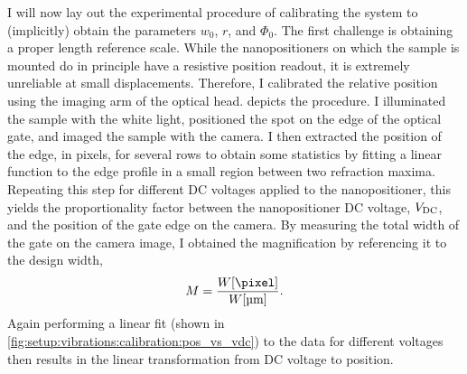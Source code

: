 I will now lay out the experimental procedure of calibrating the system to (implicitly) obtain the parameters $w_0$, $r$, and $\Phi_0$.
The first challenge is obtaining a proper length reference scale.
While the nanopositioners on which the sample is mounted do in principle have a resistive position readout, it is extremely unreliable at small displacements.
Therefore, I calibrated the relative position using the imaging arm of the optical head.
 depicts the procedure.
I illuminated the sample with the white light, positioned the spot on the edge of the optical gate, and imaged the sample with the \cmoscam camera.
I then extracted the position of the edge, in pixels, for several rows to obtain some statistics by fitting a linear function to the edge profile in a small region between two refraction maxima.
Repeating this step for different DC voltages applied to the nanopositioner,
this yields the proportionality factor between the nanopositioner DC voltage, $V_{\mathrm{DC}}$, and the position of the gate edge on the camera.
By measuring the total width of the gate on the camera image, I obtained the magnification by referencing it to the design width,
\begin{equation}\label{eq:setup:knife_edge:magnification}
    M = \frac{W[\unit{\pixel}]}{W[\unit{\micro\meter}]}.
\end{equation}
Again performing a linear fit (shown in \cref{fig:setup:vibrations:calibration:pos_vs_vdc}) to the data for different voltages then results in the linear transformation from DC voltage to position.

